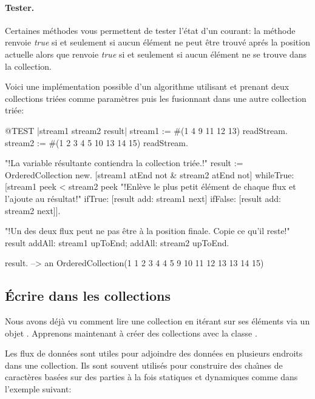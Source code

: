 \documentclass[a4paper,10pt,twoside]{book}
\begin{document}
\paragraph{Tester.} Certaines m\'ethodes vous permettent de tester l'\'etat d'un \stream courant: 
la m\'ethode  renvoie \emph{true} si et seulement si aucun \'el\'ement ne peut \^etre trouv\'e apr\'es la position actuelle alors que  renvoie \emph{true} si et seulement si aucun \'el\'ement ne se trouve dans la collection.

Voici une impl\'ementation possible d'un algorithme utilisant  et prenant deux collections tri\'ees comme param\`etres puis les fusionnant dans une autre collection tri\'ee:

\begin{code}{@TEST |stream1 stream2 result|}
stream1 := #(1 4 9 11 12 13) readStream.
stream2 := #(1 2 3 4 5 10 13 14 15) readStream.

"!La variable r\'esultante contiendra la collection tri\'ee.!"
result := OrderedCollection new.
[stream1 atEnd not & stream2 atEnd not]
  whileTrue: [stream1 peek < stream2 peek
    "!Enl\`eve le plus petit \'el\'ement de chaque flux et l'ajoute au r\'esultat!"
    ifTrue: [result add: stream1 next]
    ifFalse: [result add: stream2 next]].

"!Un des deux flux peut ne pas \^etre \`a la position finale. Copie ce qu'il reste!"
result
  addAll: stream1 upToEnd;
  addAll: stream2 upToEnd.

result. -->   an OrderedCollection(1 1 2 3 4 4 5 9 10 11 12 13 13 14 15)
\end{code}

\subsection{\'Ecrire dans les collections}

Nous avons d\'ej\`a vu comment lire une collection en it\'erant sur ses
\'el\'ements via un objet . Apprenons maintenant \`a cr\'eer
des collections avec la classe .

Les flux de donn\'ees  sont utiles pour adjoindre des donn\'ees en plusieurs endroits dans une collection. Ils sont souvent utilis\'es pour construire des cha\^{\i}nes de caract\`eres bas\'ees sur des parties \`a la fois statiques et dynamiques comme dans l'exemple suivant:
\end{document}
